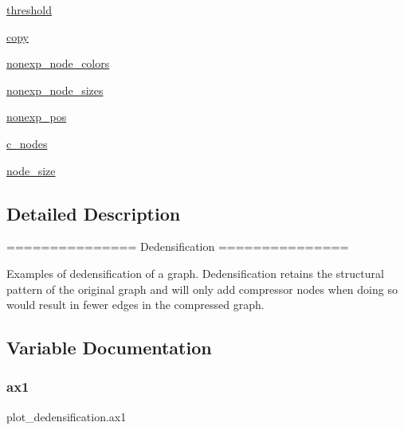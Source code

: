 \begin{DoxyCompactItemize}
\hyperlink{namespaceplot__dedensification_af6de8b8af2acb404805f1a8bc56c487c}{threshold}
\item 
\hyperlink{namespaceplot__dedensification_a7ceb23d776226953226bfe3b12a1f862}{copy}
\item 
\hyperlink{namespaceplot__dedensification_a4c8ccda2a357e16ac96b130b46d5238b}{nonexp\+\_\+node\+\_\+colors}
\item 
\hyperlink{namespaceplot__dedensification_a179c4594be91baa490e6b671b6a1441f}{nonexp\+\_\+node\+\_\+sizes}
\item 
\hyperlink{namespaceplot__dedensification_a9a8e39f6349582a9c8ae8aef5bd61d9d}{nonexp\+\_\+pos}
\item 
\hyperlink{namespaceplot__dedensification_aa6eb9c095b9848d6cd46f8f825fd5f28}{c\+\_\+nodes}
\item 
\hyperlink{namespaceplot__dedensification_a1aade74002ae10d2742f68193a854f30}{node\+\_\+size}
\end{DoxyCompactItemize}


\subsection{Detailed Description}
\begin{DoxyVerb}===============
Dedensification
===============

Examples of dedensification of a graph.  Dedensification retains the structural
pattern of the original graph and will only add compressor nodes when doing so
would result in fewer edges in the compressed graph.
\end{DoxyVerb}
 

\subsection{Variable Documentation}
\mbox{\label{namespaceplot__dedensification_af97cf6bbfe0e1b03f4b19afbad29853a}} 
\subsubsection{\texorpdfstring{ax1}{ax1}}
{\footnotesize\ttfamily plot\+\_\+dedensification.\+ax1}

\mbox{\label{namespaceplot__dedensification_ac6788553e8898b5d95e7a0cd26cfeb6d}} 
